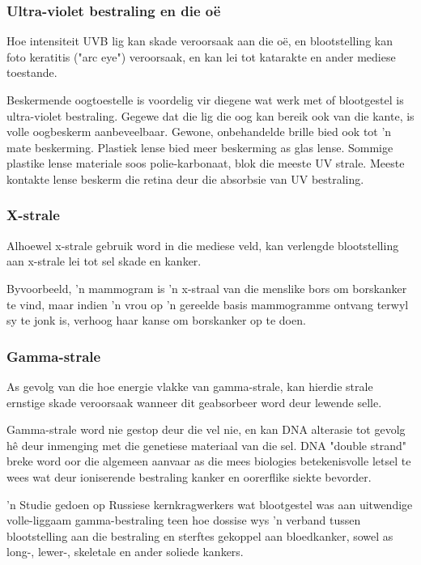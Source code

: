             \subsubsection*{Ultra-violet bestraling en die o\"e}
            \nopagebreak
        \label{m38779*id189581}Hoe intensiteit UVB lig kan skade veroorsaak aan die o\"e, en blootstelling kan foto keratitis ("arc eye") veroorsaak, en kan lei tot katarakte en ander mediese toestande. \par 
        \label{m38779*id189586}Beskermende oogtoestelle is voordelig vir diegene wat werk met of blootgestel is ultra-violet bestraling. Gegewe dat die lig die oog kan bereik ook van die kante, is volle oogbeskerm aanbeveelbaar. 
        \label{m38779*id189594} Gewone, onbehandelde brille bied ook tot 'n mate beskerming. Plastiek lense bied meer beskerming as glas lense. Sommige plastike lense materiale soos polie-karbonaat, blok die meeste UV strale. Meeste kontakte lense beskerm die retina deur die absorbsie van UV bestraling. \par 
      \label{m38779*uid22}
      \begin{minipage}{.5\textwidth}
            \subsubsection*{X-strale}
            \nopagebreak
        \label{m38779*id189613}Alhoewel x-strale gebruik word in die mediese veld, kan verlengde blootstelling aan x-strale lei tot sel skade en kanker. \par 
        \label{m38779*id189617} Byvoorbeeld, 'n mammogram is 'n x-straal van die menslike bors om borskanker te vind, maar indien 'n vrou op 'n gereelde basis mammogramme ontvang terwyl sy te jonk is, verhoog haar kanse om borskanker op te doen. \par 
      \label{m38779*uid23}
            \subsubsection*{Gamma-strale}
            \nopagebreak
        \label{m38779*id189632}As gevolg van die hoe energie vlakke van gamma-strale, kan hierdie strale ernstige skade veroorsaak wanneer dit geabsorbeer word deur lewende selle. \par 
        \label{m38779*id189636}Gamma-strale word nie gestop deur die vel nie, en kan DNA alterasie tot gevolg h\^e deur inmenging met die genetiese materiaal van die sel. DNA "double strand" breke word oor die algemeen aanvaar as die mees biologies betekenisvolle letsel te wees wat deur ioniserende bestraling kanker en oorerflike siekte bevorder. \par 
        \label{m38779*id189642} 'n Studie gedoen op Russiese kernkragwerkers wat blootgestel was aan uitwendige volle-liggaam gamma-bestraling teen hoe dossise wys 'n verband tussen blootstelling aan die bestraling en sterftes gekoppel aan bloedkanker, sowel as long-, lewer-, skeletale en ander soliede kankers. \par 
      \label{m38779*eip-665}
\end{minipage}

